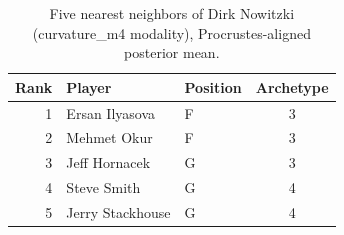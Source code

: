 \begin{table}[htbp]
  \centering\small
  \begin{tabular}{rllc}
    \toprule
    Rank & Player & Position & Archetype \\
    \midrule
    1 & Ersan Ilyasova & F & 3 \\
    2 & Mehmet Okur & F & 3 \\
    3 & Jeff Hornacek & G & 3 \\
    4 & Steve Smith & G & 4 \\
    5 & Jerry Stackhouse & G & 4 \\
    \bottomrule
  \end{tabular}
  \caption{Five nearest neighbors of Dirk Nowitzki (curvature_m4 modality), Procrustes-aligned posterior mean.}
  \label{tab:Dirk_Nowitzki_neighbors_curvature_m4}
\end{table}

